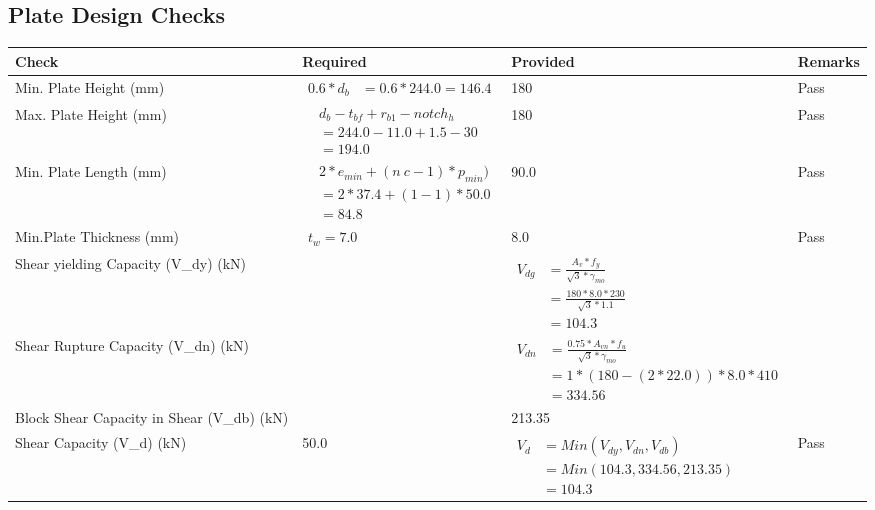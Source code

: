 \documentclass{article}%
\begin{document}
\subsection{Plate Design Checks}%
\label{subsec:PlateDesignChecks}%
\renewcommand{\arraystretch}{1.2}%
\begin{longtable}{|p{4cm}|p{5cm}|p{5.5cm}|p{1.5cm}|}%
\hline%
\rowcolor{OsdagGreen}%
Check&Required&Provided&Remarks\\%
\hline%
\endhead%
\hline%
Min. Plate Height (mm)&$\begin{aligned}0.6 * d_b&= 0.6 * 244.0=146.4\end{aligned}$&180&Pass\\%
\hline%
Max. Plate Height (mm)&$\begin{aligned} &d_b - t_{bf} + r_{b1} - notch_h\\ &=244.0-11.0+1.5-30\\ &=194.0\end{aligned}$&180&Pass\\%
\hline%
Min. Plate Length (mm)&$\begin{aligned} &2*e_{min} + (n~c-1) * p_{min})\\ &=2*37.4+(1-1) * 50.0\\ &=84.8\end{aligned}$&90.0&Pass\\%
\hline%
Min.Plate Thickness (mm)&$\begin{aligned} t_w=7.0\end{aligned}$&8.0&Pass\\%
\hline%
Shear yielding Capacity (V\_dy) (kN)&&$\begin{aligned} V_{dg} &= \frac{A_v*f_y}{\sqrt{3}*\gamma_{mo}}\\ &=\frac{180*8.0*230}{\sqrt{3}*1.1}\\ &=104.3\end{aligned}$&\\%
\hline%
Shear Rupture Capacity (V\_dn) (kN)&&$\begin{aligned} V_{dn} &= \frac{0.75*A_{vn}*f_u}{\sqrt{3}*\gamma_{mo}}\\ &=1*(180-(2*22.0))*8.0*410\\ &=334.56\end{aligned}$&\\%
\hline%
Block Shear Capacity in Shear (V\_db) (kN)&&213.35&\\%
\hline%
Shear Capacity (V\_d) (kN)&50.0&$\begin{aligned} V_d &= Min(V_{dy},V_{dn},V_{db})\\ &= Min(104.3,334.56,213.35)\\ &=104.3\end{aligned}$&Pass\\%

\end{longtable}
\end{document}
